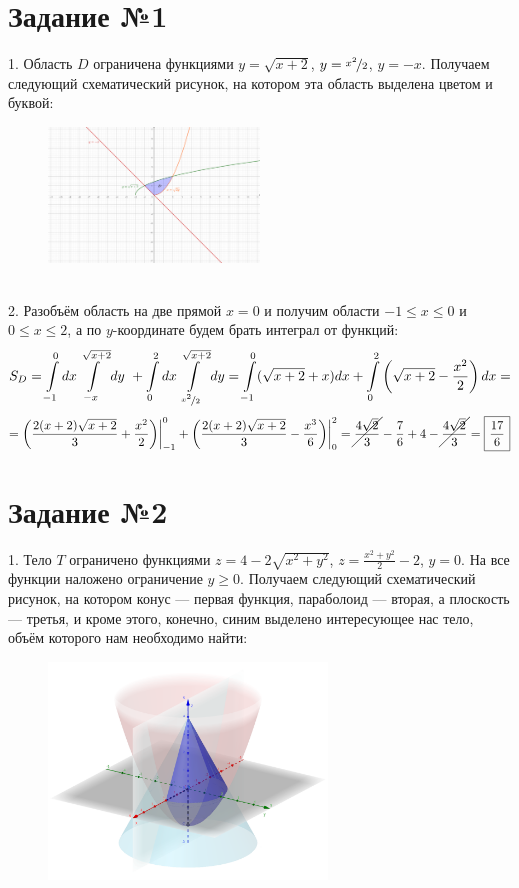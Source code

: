 \documentclass[a3paper,14pt]{extarticle}
\newcommand*\squared[1]{\tikz[baseline=(char.base)]{
            \node[shape=rectangle,draw,inner sep=4pt] (char) {#1};}}
\newcommand{\at}{\biggr\rvert}
\begin{document}
\section*{\centering Задание №1}
1. Область $D$ ограничена функциями $y = \sqrt{x+2}$, $y = \nicefrac{x^2}{2}$, $y = -x$. Получаем следующий схематический рисунок, на котором эта область выделена цветом и буквой:
\begin{figure}[h]
    \centering\includegraphics[width=0.5\textwidth]{1.png}
\end{figure} \,\\[1em]
2. Разобъём область на две прямой $x = 0$ и получим области $-1 \le x \le 0$ и $0 \le x \le 2$, а по $y$-координате будем брать интеграл от функций:
$$S_D = \int\limits_{-1}^0dx\int\limits_{-x}^{\sqrt{x+2}}dy \ + \int\limits_0^2dx\int\limits_{\nicefrac{x^2}{2}}^{\sqrt{x+2}}dy = \int\limits_{-1}^0(\sqrt{x+2} + x)dx +\int\limits_0^2\left(\sqrt{x+2} - \frac{x^2}{2}\right)dx = $$
$$ = \left(\frac{2(x+2)\sqrt{x+2}}{3}+\frac{x^2}{2}\right)\at^0_{-1}+\left(\frac{2(x+2)\sqrt{x+2}}{3}-\frac{x^3}{6}\right)\at^2_0 = \cancel{\frac{4\sqrt{2}}{3}} - \frac{7}{6} + 4 - \cancel{\frac{4\sqrt{2}}{3}} = \squared{$\dfrac{17}{6}$}$$

\section*{\centering Задание №2}
1. Тело $T$ ограничено функциями $z = 4 - 2\sqrt{x^2+y^2}$, $z = \frac{x^2+y^2}{2}-2$, $y = 0$. На все функции наложено ограничение $y \ge 0$. Получаем следующий схематический рисунок, на котором конус --- первая функция, параболоид --- вторая, а плоскость --- третья, и кроме этого, конечно, синим выделено интересующее нас тело, объём которого нам необходимо найти:
\begin{figure}[h]
    \centering\includegraphics[width=0.66\textwidth]{2.png}
\end{figure}
\end{document}

